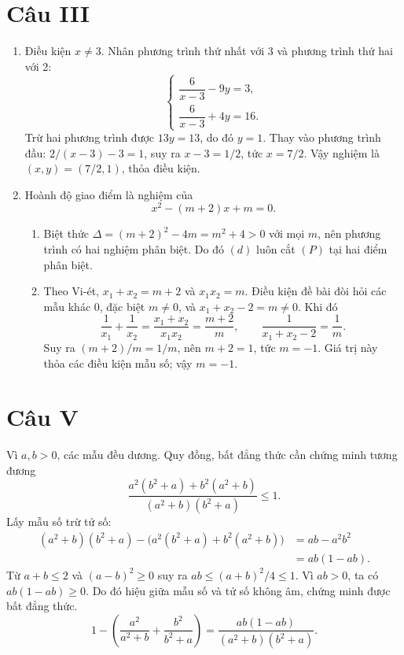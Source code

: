 \documentclass[12pt,a4paper]{article}
\begin{document}
\section*{Câu III}
\begin{enumerate}
\item Điều kiện $x\ne3$. Nhân phương trình thứ nhất với 3 và phương trình thứ hai với 2:
\[
\begin{cases}
\dfrac6{x-3}-9y=3,\\[3pt]
\dfrac6{x-3}+4y=16.
\end{cases}
\]
Trừ hai phương trình được $13y=13$, do đó $y=1$. Thay vào phương trình đầu: $2/(x-3)-3=1$, suy ra $x-3=1/2$, tức $x=7/2$. Vậy nghiệm là $(x,y)=(7/2,1)$, thỏa điều kiện.
\item Hoành độ giao điểm là nghiệm của
\[
x^2-(m+2)x+m=0.
\]
\begin{enumerate}[label=\alph*)]
\item Biệt thức $\Delta=(m+2)^2-4m=m^2+4>0$ với mọi $m$, nên phương trình có hai nghiệm phân biệt. Do đó $(d)$ luôn cắt $(P)$ tại hai điểm phân biệt.
\item Theo Vi-ét, $x_1+x_2=m+2$ và $x_1x_2=m$. Điều kiện đề bài đòi hỏi các mẫu khác 0, đặc biệt $m\ne0$, và $x_1+x_2-2=m\ne0$. Khi đó
\[
\frac1{x_1}+\frac1{x_2}=\frac{x_1+x_2}{x_1x_2}
=\frac{m+2}{m},\qquad
\frac1{x_1+x_2-2}=\frac1m.
\]
Suy ra $(m+2)/m=1/m$, nên $m+2=1$, tức $m=-1$. Giá trị này thỏa các điều kiện mẫu số; vậy $m=-1$.
\end{enumerate}
\end{enumerate}

\section*{Câu V}
Vì $a,b>0$, các mẫu đều dương. Quy đồng, bất đẳng thức cần chứng minh tương đương
\[
\frac{a^2(b^2+a)+b^2(a^2+b)}{(a^2+b)(b^2+a)}\le1.
\]
Lấy mẫu số trừ tử số:
\begin{align*}
(a^2+b)(b^2+a)-\bigl(a^2(b^2+a)+b^2(a^2+b)\bigr)
&=ab-a^2b^2\\
&=ab(1-ab).
\end{align*}
Từ $a+b\le2$ và $(a-b)^2\ge0$ suy ra $ab\le(a+b)^2/4\le1$. Vì $ab>0$, ta có $ab(1-ab)\ge0$. Do đó hiệu giữa mẫu số và tử số không âm, chứng minh được bất đẳng thức.
\[
1-\left(\frac{a^2}{a^2+b}+\frac{b^2}{b^2+a}\right)
=\frac{ab(1-ab)}{(a^2+b)(b^2+a)}.
\]
\end{document}
